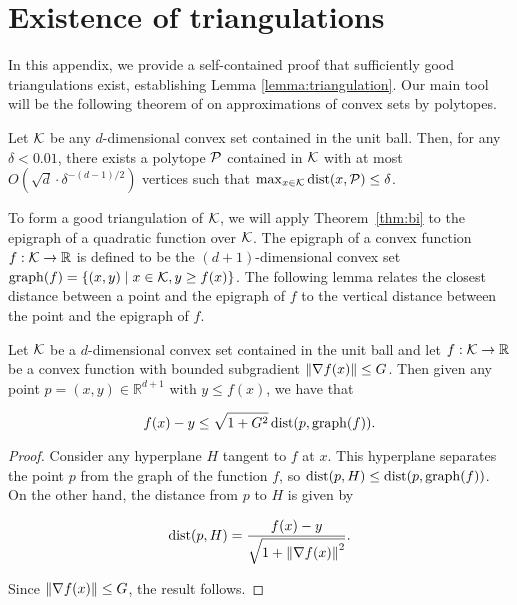 \section{Existence of triangulations}\label{app:triangulation-proof}

In this appendix, we provide a self-contained proof that sufficiently good triangulations exist, establishing Lemma \ref{lemma:triangulation}. Our main tool will be the following theorem of \cite{bronshteyn1975approximation} on approximations of convex sets by polytopes.

\begin{theorem}\label{thm:bi}
Let $\mathcal{K}$ be any $d$-dimensional convex set contained in the unit ball. Then, for any $\delta < 0.01$, there exists a polytope $\mathcal{P}$ contained in $\mathcal{K}$ with at most $O(\sqrt{d}\cdot\delta^{-(d-1)/2})$ vertices such that $\max_{x \in \mathcal{K}} \operatorname{dist}(x, \mathcal{P}) \leq \delta$. 
\end{theorem}

To form a good triangulation of $\mathcal{K}$, we will apply Theorem~\ref{thm:bi} to the epigraph of a quadratic function over $\mathcal{K}$. The epigraph of a convex function $f: \mathcal{K} \rightarrow \mathbb{R}$ is defined to be the $(d+1)$-dimensional convex set $\operatorname{graph}(f) = \{(x, y) \mid x \in \mathcal{K}, y \geq f(x)\}$. The following lemma relates the closest distance between a point and the epigraph of $f$ to the vertical distance between the point and the epigraph of $f$.

\begin{lemma}\label{lem:epigraph-distance}
Let $\mathcal{K}$ be a $d$-dimensional convex set contained in the unit ball and let $f: \mathcal{K} \rightarrow \mathbb{R}$ be a convex function with bounded subgradient $\left\|\nabla f(x)\right\| \leq G$. Then given any point $p = (x, y) \in \mathbb{R}^{d+1}$ with $y \leq f(x)$, we have that

$$f(x) - y \leq \sqrt{1+G^2}\operatorname{dist}(p, \operatorname{graph}(f)).$$
\end{lemma}
\begin{proof}
Consider any hyperplane $H$ tangent to $f$ at $x$. This hyperplane separates the point $p$ from the graph of the function $f$, so $\operatorname{dist}(p, H) \leq \operatorname{dist}(p, \operatorname{graph}(f))$. On the other hand, the distance from $p$ to $H$ is given by

$$\operatorname{dist}(p, H) = \frac{f(x) - y}{\sqrt{1 + \left\|\nabla f(x)\right\|^2}}.$$

Since $\left\|\nabla f(x)\right\| \leq G$, the result follows.
\end{proof}


